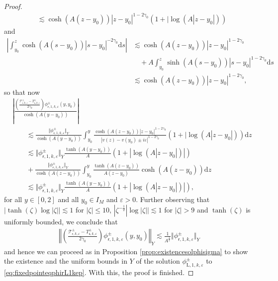 \documentclass[11pt,reqno]{amsproc}
\theoremstyle{definition}
\numberwithin{equation}{section}
\newcommand{\rL}{{\mathrm{L}}}
\newcommand{\sr}{{\mathsf{r}}}
\newcommand{\s}{{\mathsf{s}}}
\newcommand{\cT}{{\mathcal T}}
\renewcommand{\d}{\mathrm{d}}
\newcommand{\ep}{\varepsilon}
\begin{document}
\begin{proof}
\begin{align*}
&\lesssim \cosh(A(z-y_0)) |z-y_0|^{1-2\gamma_0}\left( 1 + |\log (A|z-y_0|) \right)
\end{align*}
and
\begin{align*}
\left| \int_{y_0}^z \cosh(A(s-y_0)) |s-y_0|^{-2\gamma_0} \d s \right| &\lesssim \cosh(A(z-y_0))|z-y_0|^{1-2\gamma_0} \\
&\quad +A  \int_{y_0}^z \sinh(A(s-y_0)) |s-y_0|^{1-2\gamma_0} \d s \\
&\lesssim \cosh(A(z-y_0))|z-y_0|^{1-2\gamma_0}, 
\end{align*}
so that now
\begin{align*}
&\left| \frac{\left(\frac{\cT_{\sr,k,\ep}^\pm-T_{\s,k,\ep}^\pm}{2\gamma_0} \right)\phi_{\sr,1,k,\ep}^\pm(y,y_0)}{\cosh(A(y-y_0))} \right| \\
&\qquad\lesssim \frac{\Vert \phi_{\sr,1,k,\ep}^\pm \Vert_Y}{\cosh(A(y-y_0))}\int_{y_0}^y\frac{\cosh(A(z-y_0))|z-y_0|^{1-2\gamma_0}}{|v(z) - v(y_0) \pm i\ep|^{1-2\gamma_0}}\left(1 + |\log (A|z-y_0|) \right) \d z \\
&\qquad\lesssim \Vert \phi_{\sr,1,k,\ep}^\pm \Vert_Y\frac{\tanh(A(y-y_0))}{A} \left( 1 + |\log (A|z-y_0|)| \right) \\
&\qquad + \frac{\Vert \phi_{\sr,1,k,\ep}^\pm \Vert_Y}{\cosh(A(z-y_0))}\int_{y_0}^y \frac{\tanh(A(z-y_0))}{A(z-y_0)}\cosh(A(z-y_0)) \d z \\
&\qquad\lesssim \Vert \phi_{\sr,1,k,\ep}^\pm \Vert_Y\frac{\tanh(A(y-y_0))}{A} \left( 1 + |\log (A|z-y_0|)| \right),
\end{align*}
for all $y\in[0,2]$ and all $y_0\in I_M$ and $\ep>0$. Further observing that $|\tanh(\zeta)\log|\zeta| |\lesssim 1$ for $|\zeta|\leq 10$,  $|\zeta^{-\frac12} |\log|\zeta||\lesssim 1$ for $|\zeta|>9$ and $\tanh(\zeta)$ is uniformly bounded, we conclude that
\begin{align*}
\left \Vert \left(\frac{\cT_{\sr,k,\ep}^\pm-T_{\s,k,\ep}^\pm}{2\gamma_0} \right)\phi_{\sr,1,k,\ep}^\pm(y,y_0) \right \Vert_Y \lesssim \frac{1}{A^\frac12}\Vert \phi_{\sr,1,k,\ep}^\pm \Vert_Y
\end{align*}
and hence we can proceed as in Proposition \ref{prop:existencesolphisigma} to show the existence and the uniform bounds in $Y$ of the solution $\phi_{\rL,1,k,\ep}^\pm$ to \eqref{eq:fixedpointeqphirL1kep}. With this, the proof is finished.
\end{proof}
\end{document}
